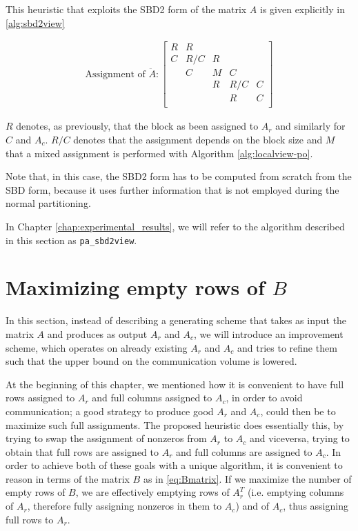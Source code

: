 This heuristic that exploits the SBD2 form of the matrix $A$ is given explicitly in \eqref{alg:sbd2view}

\begin{align}
	\text{Assignment of } \ddot{A}: \begin{bmatrix}
		R & R & & & \\
		C & R/C & R & & \\
		& C & M & C & \\
		& & R & R/C & C \\
		& & & R & C \\
	\end{bmatrix}
	\label{eq:sbd2view}
\end{align}

$R$ denotes, as previously, that the block as been assigned to $A_r$ and similarly for $C$ and $A_c$. $R/C$ denotes that the assignment depends on the block size and $M$ that a mixed assignment is performed with Algorithm \ref{alg:localview-po}.

Note that, in this case, the SBD2 form has to be computed from scratch from the SBD form, because it uses further information that is not employed during the normal partitioning.

In Chapter \ref{chap:experimental_results}, we will refer to the algorithm described in this section as \verb|pa_sbd2view|.

\section{Maximizing empty rows of $B$} \label{sec:globalview}

In this section, instead of describing a generating scheme that takes as input the matrix $A$ and produces as output $A_r$ and $A_c$, we will introduce an improvement scheme, which operates on already existing $A_r$ and $A_c$ and tries to refine them such that the upper bound on the communication volume is lowered.

At the beginning of this chapter, we mentioned how it is convenient to have full rows assigned to $A_r$ and full columns assigned to $A_c$, in order to avoid communication; a good strategy to produce good $A_r$ and $A_c$, could then be to maximize such full assignments. The proposed heuristic does essentially this, by trying to swap the assignment of nonzeros from $A_r$ to $A_c$ and viceversa, trying to obtain that full rows are assigned to $A_r$ and full columns are assigned to $A_c$. In order to achieve both of these goals with a unique algorithm, it is convenient to reason in terms of the matrix $B$ as in \eqref{eq:Bmatrix}. If we maximize the number of empty rows of $B$, we are effectively emptying rows of $A_r^T$ (i.e. emptying columns of $A_r$, therefore fully assigning nonzeros in them to $A_c$) and of $A_c$, thus assigning full rows to $A_r$.

